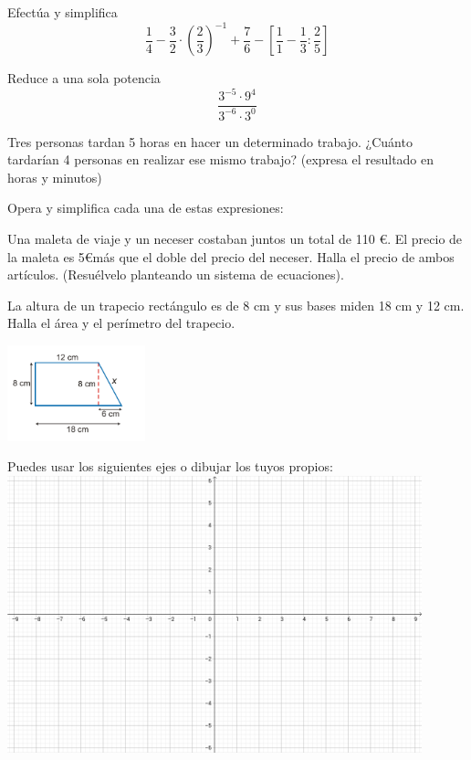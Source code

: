 \documentclass[addpoints,spanish, 12pt,a4paper]{exam}
\begin{document}
\begin{questions}

\question[1] Efectúa y simplifica  \[\frac{1}{4}-\frac{3}{2}\cdot\left(\frac{2}{3}\right)^{-1}+\frac{7}{6}-\left[\frac{1}{1}-\frac{1}{3}:\frac{2}{5}\right]\]
\addpoints

\question[1] Reduce a una sola potencia  \[\frac{3^{-5}\cdot9^{4}}{3^{-6}\cdot3^{0}}\]
\addpoints

\question[1] Tres personas tardan 5 horas en hacer un determinado trabajo. ¿Cuánto tardarían 4 personas en realizar ese mismo trabajo? (expresa el resultado en horas y minutos)
\addpoints

\question[2] Opera y simplifica cada una de estas expresiones:
\noaddpoints %
\addpoints


\question[2] Una maleta de viaje y un neceser costaban juntos un total de 110 \euro . El precio de la maleta es 5\euro \space más que el doble del precio del neceser. Halla el precio de ambos artículos. (Resuélvelo planteando un sistema de ecuaciones).
\addpoints

\question[1] La altura de un trapecio rectángulo es de 8 cm y sus bases miden 18 cm y 12 cm. Halla el área y el perímetro del trapecio.

\begin{center}
\includegraphics[width=0.3\textwidth]{trapecio}
\end{center}
    
\addpoints

\question[2] Puedes usar los siguientes ejes o dibujar los tuyos propios:\\
    \includegraphics[width=0.9\textwidth]{ejes}


\end{questions}
\end{document}
